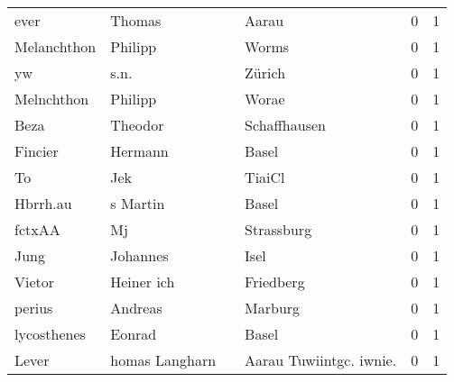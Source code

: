 \documentclass[10pt,a4paper,landscape]{article}
\begin{document}
\begin{longtable}{llllrr}
                     ever &                             Thomas &             &                                       Aarau &          0 &         1 \\
              Melanchthon &                            Philipp &             &                                       Worms &          0 &         1 \\
                       yw &                               s.n. &             &                                      Zürich &          0 &         1 \\
               Melnchthon &                            Philipp &             &                                       Worae &          0 &         1 \\
                     Beza &                            Theodor &             &                                Schaffhausen &          0 &         1 \\
                  Fincier &                            Hermann &             &                                       Basel &          0 &         1 \\
                       To &                                Jek &             &                                      TiaiCl &          0 &         1 \\
                 Hbrrh.au &                           s Martin &             &                                       Basel &          0 &         1 \\
                   fctxAA &                                 Mj &             &                                  Strassburg &          0 &         1 \\
                     Jung &                           Johannes &             &                                        Isel &          0 &         1 \\
                   Vietor &                         Heiner ich &             &                                   Friedberg &          0 &         1 \\
                   perius &                            Andreas &             &                                     Marburg &          0 &         1 \\
              lycosthenes &                             Eonrad &             &                                       Basel &          0 &         1 \\
                    Lever &                     homas Langharn &             &                    Aarau Tuwiintgc. iwnie.  &          0 &         1 \\

\end{longtable}
\end{document}
